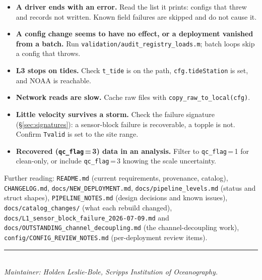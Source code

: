 \documentclass[11pt]{article}
\newcommand{\code}[1]{\texttt{#1}}
\newcommand{\qcflag}[1]{\texttt{qc\_flag}\,=\,#1}
\begin{document}
\begin{itemize}
\item \textbf{A driver ends with an error.} Read the list it prints: configs that threw and
  records not written. Known field failures are skipped and do not cause it.
\item \textbf{A config change seems to have no effect, or a deployment vanished from a batch.}
  Run \code{validation/audit\_registry\_loads.m}; batch loops skip a config that throws.
\item \textbf{L3 stops on tides.} Check \code{t\_tide} is on the path, \code{cfg.tideStation} is
  set, and NOAA is reachable.
\item \textbf{Network reads are slow.} Cache raw files with \code{copy\_raw\_to\_local(cfg)}.
\item \textbf{Little velocity survives a storm.} Check the failure signature
  (\S\ref{sec:signatures}): a sensor-block failure is recoverable, a topple is not. Confirm
  \code{Tvalid} is set to the site range.
\item \textbf{Recovered (\qcflag{3}) data in an analysis.} Filter to \qcflag{1} for clean-only,
  or include \qcflag{3} knowing the scale uncertainty.
\end{itemize}

\noindent
Further reading: \code{README.md} (current requirements, provenance, catalog),
\code{CHANGELOG.md}, \code{docs/NEW\_DEPLOYMENT.md}, \code{docs/pipeline\_levels.md} (status and
struct shapes), \code{PIPELINE\_NOTES.md} (design decisions and known issues),
\code{docs/catalog\_changes/} (what each rebuild changed),
\code{docs/L1\_sensor\_block\_failure\_2026-07-09.md} and
\code{docs/OUTSTANDING\_channel\_decoupling.md} (the channel-decoupling work),
\code{config/CONFIG\_REVIEW\_NOTES.md} (per-deployment review items).

\vfill
\noindent\rule{\textwidth}{0.4pt}\\[2pt]
\small\emph{Maintainer: Holden Leslie-Bole, Scripps Institution of Oceanography.}
\end{document}
